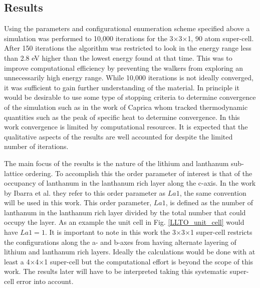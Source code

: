 \documentclass[aps,pre,reprint,superscriptaddress,showkeys]{revtex4-2}
\begin{document}
\subsection{Results}
  Using the parameters and configurational enumeration scheme specified above a simulation was performed to 10,000 iterations for  the 3$\times$3$\times$1,  90 atom super-cell. After 150 iterations the algorithm was restricted to look  in the energy range less than 2.8 eV higher than the lowest energy found at that time. This was to improve computational efficiency by preventing the walkers from exploring an unnecessarily high energy range. While 10,000 iterations is not ideally converged, it was sufficient to gain further understanding of the material. In principle it would be desirable to use some type of stopping criteria to determine convergence of the simulation such as in the work of Caprica\cite{halting_wang_and_landau} whom tracked thermodynamic quantities such as the peak of specific heat to determine convergence. In this work convergence is limited by computational resources.   
It is expected that the qualitative aspects of the results are well accounted for despite the limited number of iterations. 
  
The main focus of the results is the nature of the lithium and lanthanum sub-lattice ordering. To accomplish this the order parameter of interest is that of the occupancy of lanthanum in the lanthanum rich layer along the c-axis.  In the work by Ibarra et al. \cite{P4mmmstrucuture} they refer to this order parameter as $La1$, the same convention will be used in this work. This order parameter, $La1$, is defined as the number of lanthanum in the lanthanum rich layer divided by the total number that could occupy the layer. As an example the unit cell in Fig. \ref{LLTO_unit_cell} would have $La1=1$. It is important to note in this work the 3$\times$3$\times$1 super-cell restricts the configurations along the a- and b-axes from having alternate layering of lithium and lanthanum rich layers. Ideally the calculations would be done with at least a 4$\times$4$\times$1 super-cell but the computational effort is beyond the scope of this work. The results later will have to be interpreted taking this systematic super-cell error into account.  
  
\end{document}

